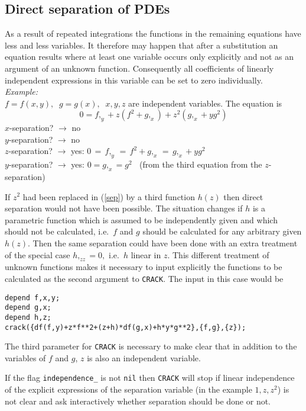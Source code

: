 \subsection{Direct separation of PDEs}
As a result of repeated integrations the functions in the 
remaining equations have less and less variables. It therefore may happen
that after a substitution an equation results where at least one variable
occurs only explicitly and not as an argument of an unknown function.
Consequently all coefficients of linearly independent expressions in this
variable can be set to zero individually. \\

{\em Example:}  \\
$f = f(x,y), \;\; g = g(x), \;\; x,y,z$ are independent variables. 
The equation is
\begin{equation} 
0 = f,_y + z(f^2+g,_x) + z^2(g,_x+yg^2) \label{sep}
\end{equation}
$x$-separation? $\rightarrow$ no  \\
$y$-separation? $\rightarrow$ no  \\
$z$-separation? $\rightarrow$ yes: $0 \,=\, f,_y \,=\, f^2+g,_x \,=\,
g,_x+yg^2$ \\
$y$-separation? $\rightarrow$ yes: $0 = g,_x = g^2\;\;$ 
(from the third equation from the $z$-separation)   

If $z^2$ had been replaced in (\ref{sep}) by a third
function $h(z)$ then direct separation would not have been possible.
The situation changes if $h$ is a parametric function which is
assumed to be independently given and which should not be
calculated, i.e.\ $f$ and $g$ should be calculated for any
arbitrary given $h(z)$. Then the same separation could have been
done with an extra treatment of the special case $h,_{zz} = 0,$
i.e.\ $h$ linear in $z$. This different treatment of unknown functions
makes it necessary to input explicitly the functions to be
calculated as the second argument to {\tt CRACK}. The input
in this case would be
\begin{verbatim}
depend f,x,y;
depend g,x;
depend h,z;
crack({df(f,y)+z*f**2+(z+h)*df(g,x)+h*y*g**2},{f,g},{z});
\end{verbatim}
The third parameter for {\tt CRACK} is necessary to make clear that
in addition to the variables of $f$ and $g$, $z$ is also an independent
variable.
 
If the flag {\tt independence\_} is not {\tt nil} then {\tt CRACK} will
stop if linear independence of the explicit expressions of the
separation variable (in the example $1,z,z^2$) is not clear and ask 
interactively whether separation should be done or not.

